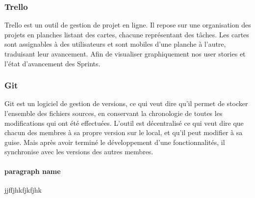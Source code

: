 \subsubsection{Trello} %
\label{ssub:subsubsection_name}

Trello est un outil de gestion de projet en ligne. Il repose sur une organisation des projets en planches listant des cartes, chacune représentant des tâches. Les cartes sont assignables à des utilisateurs et sont mobiles d'une planche à l'autre, traduisant leur avancement. Afin de visualiser graphiquement nos user stories et l’état d'avancement des Sprints.


\subsubsection{Git} %
\label{ssub:git}

Git est un logiciel de gestion de versions, ce qui veut dire qu'il permet de stocker l’ensemble des fichiers sources, en conservant la chronologie de toutes les modifications qui ont été effectuées.\newline
L'outil est décentralisé ce qui veut dire que chacun des membres à sa propre version sur le local, et qu'il peut modifier à sa guise. Mais après avoir terminé le développement d'une fonctionnalités, il synchronise avec les versions des autres membres.
\paragraph{paragraph name} %
\label{par:paragraph_name}
jjffjhkfjkfjhk
